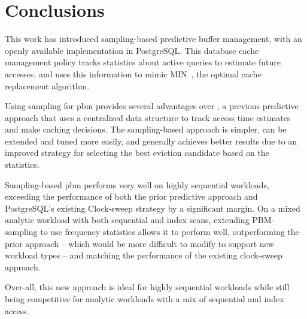 
\chapter{Conclusions}
\label{ch:conclusion}

This work has introduced sampling-based predictive buffer management, with an openly available implementation in PostgreSQL. This database cache management policy tracks statistics about active queries to estimate future accesses, and uses this information to mimic MIN~\cite{beladyMIN}, the optimal cache replacement algorithm.

Using sampling for \gls{pbm} provides several advantages over \cite{pbm}, a previous predictive approach that uses a centralized data structure to track access time estimates and make caching decisions. The sampling-based approach is simpler, can be extended and tuned more easily, and generally achieves better results due to an improved strategy for selecting the best eviction candidate based on the statistics.

Sampling-based \gls{pbm} performs very well on highly sequential workloads, exceeding the performance of both the prior predictive approach and PostgreSQL's existing Clock-sweep strategy by a significant margin. On a mixed analytic workload with both sequential and index scans, extending PBM-sampling to use frequency statistics allows it to perform well, outperforming the prior approach -- which would be more difficult to modify to support new workload types -- and matching the performance of the existing clock-sweep approach.

Over-all, this new approach is ideal for highly sequential workloads while still being competitive for analytic workloads with a mix of sequential and index access.


